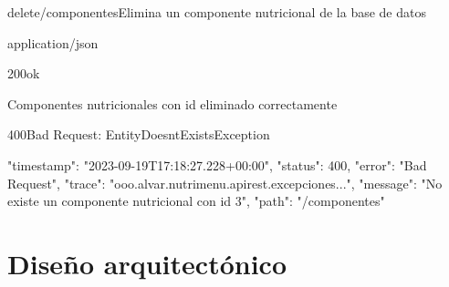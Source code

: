 \begin{apiRoute}{delete}{/componentes}{Elimina un componente nutricional de la base de datos}
	\begin{routeParameter}
	\end{routeParameter}
	\begin{routeResponse}{application/json}
		\begin{routeResponseItem}{200}{ok}
			\begin{routeResponseItemBody}
Componentes nutricionales con id eliminado correctamente	
			\end{routeResponseItemBody}
		\end{routeResponseItem}
		
	\begin{routeResponseItem}{400}{Bad Request: EntityDoesntExistsException}
			\begin{routeResponseItemBody}
{
    "timestamp": "2023-09-19T17:18:27.228+00:00",
    "status": 400,
    "error": "Bad Request",
    "trace": "ooo.alvar.nutrimenu.apirest.excepciones...",
    "message": "No existe un componente nutricional con id 3",
    "path": "/componentes"
}
			\end{routeResponseItemBody}
		\end{routeResponseItem}
		
	\end{routeResponse}
\end{apiRoute}

\section{Diseño arquitectónico}


